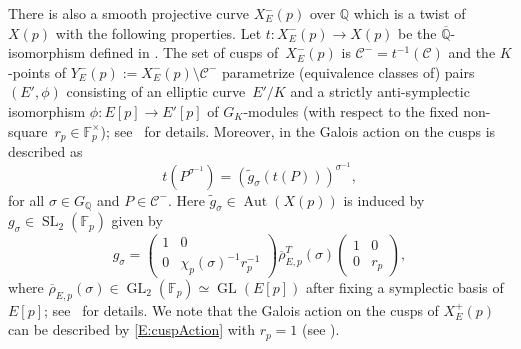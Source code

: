 \documentclass[12pt]{amsart}
\numberwithin{equation}{section}
\theoremstyle{definition}
\newcommand{\F}{\mathbb{F}}
\newcommand{\Q}{\mathbb{Q}}
\newcommand{\rhobar}{{\overline{\rho}}}
\newcommand{\Qbar}{{\overline{\Q}}}
\DeclareMathOperator{\GL}{GL}
\DeclareMathOperator{\SL}{SL}
\DeclareMathOperator{\Aut}{Aut}
\newcommand{\cC}{\mathcal{C}}
\begin{document}
There is also a smooth projective curve $X_E^-(p)$ over $\Q$ which is a twist of $X(p)$ with the following properties. Let $t  : X_E^-(p) \to X(p)$ be the $\Qbar$-isomorphism defined
in \cite[p.459]{Halberstadt}. The set of cusps of~$X_E^-(p)$ is
$\cC^- = t^{-1}(\cC)$ and the $K$-points of $Y_E^-(p) := X_E^-(p) \setminus \cC^-$
parametrize (equivalence classes of) pairs $(E', \phi)$ consisting of an elliptic curve~$E'/K$
and a strictly anti-symplectic isomorphism $\phi : E[p] \to E'[p]$ of $G_K$-modules (with respect to the fixed non-square~$r_p\in \F_p^\times$);
see~\cite[\S 5.4]{Halberstadt} for details. Moreover, in \cite[p. 459]{Halberstadt} 
the Galois action on the cusps is described as 
\begin{equation}\label{E:cuspAction}
  t(P^{\sigma^{-1}}) = (\tilde{g}_\sigma(t(P)))^{\sigma^{-1}},
\end{equation}
for all $\sigma \in G_\Q$ and $P \in \cC^-$. Here $\tilde{g}_\sigma \in \Aut(X(p))$ is induced by
 $g_\sigma \in \SL_2(\F_p)$ given by 
\[
 g_\sigma = \begin{pmatrix}
				1 & 0 \\
				0 & \chi_p(\sigma)^{-1} r_p^{-1}
			\end{pmatrix} \rhobar_{E,p}^T(\sigma)
			 \begin{pmatrix}
				1 & 0 \\
				0 &  r_p
			\end{pmatrix},
\]
where
$\rhobar_{E,p}(\sigma) \in \GL_2(\F_p) \simeq \GL(E[p])$ after fixing a symplectic basis of $E[p]$; see~\cite[p. 458]{Halberstadt} for details. We note that the Galois action on the cusps of $X_E^+(p)$ can be described by \eqref{E:cuspAction} with $r_p=1$ (see \cite[\S 5.3.2]{Halberstadt}).
\end{document}
